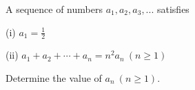 A sequence of numbers $ a_1, a_2, a_3, ...$ satisfies

(i) $ a_1 = \frac{1}{2}$

(ii) $ a_1+a_2 + \cdots + a_n = n^2 a_n \ (n \geq 1)$

Determine the value of $ a_n \ (n \geq 1)$.